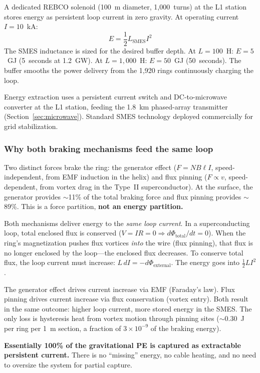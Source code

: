 \documentclass[12pt,letterpaper]{article}
\begin{document}
A dedicated REBCO solenoid (100~m diameter, 1{,}000~turns) at the L1 station stores energy as persistent loop current in zero gravity. At operating current $I = 10$~kA:
\begin{equation}
E = \frac{1}{2} L_{\text{SMES}} I^2
\end{equation}
The SMES inductance is sized for the desired buffer depth. At $L = 100$~H: $E = 5$~GJ (5~seconds at 1.2~GW). At $L = 1{,}000$~H: $E = 50$~GJ (50~seconds). The buffer smooths the power delivery from the 1{,}920 rings continuously charging the loop.

Energy extraction uses a persistent current switch and DC-to-microwave converter at the L1 station, feeding the 1.8~km phased-array transmitter (Section~\ref{sec:microwave}). Standard SMES technology deployed commercially for grid stabilization.

\subsubsection{Why both braking mechanisms feed the same loop}

Two distinct forces brake the ring: the generator effect ($F = NB\ell I$, speed-independent, from EMF induction in the helix) and flux pinning ($F \propto v$, speed-dependent, from vortex drag in the Type~II superconductor). At the surface, the generator provides $\sim$11\% of the total braking force and flux pinning provides $\sim$89\%. This is a force partition, \textbf{not an energy partition.}

Both mechanisms deliver energy to the \emph{same loop current}. In a superconducting loop, total enclosed flux is conserved ($V = IR = 0 \Rightarrow d\Phi_{\text{total}}/dt = 0$). When the ring's magnetization pushes flux vortices \emph{into} the wire (flux pinning), that flux is no longer enclosed by the loop---the enclosed flux decreases. To conserve total flux, the loop current must increase: $L\,dI = -d\Phi_{\text{external}}$. The energy goes into $\frac{1}{2}LI^2$.

The generator effect drives current increase via EMF (Faraday's law). Flux pinning drives current increase via flux conservation (vortex entry). Both result in the same outcome: higher loop current, more stored energy in the SMES. The only loss is hysteresis heat from vortex motion through pinning sites ($\sim$0.30~J per ring per 1~m section, a fraction of $3 \times 10^{-9}$ of the braking energy).

\textbf{Essentially 100\% of the gravitational PE is captured as extractable persistent current.} There is no ``missing'' energy, no cable heating, and no need to oversize the system for partial capture.
\end{document}
